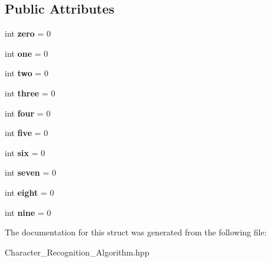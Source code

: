 \subsection*{Public Attributes}
\begin{DoxyCompactItemize}
\item 
\mbox{\label{struct_digit_result_distribution_a00bb825f2e2756c621e1d38a1ecf0818}} 
int {\bfseries zero} = 0
\item 
\mbox{\label{struct_digit_result_distribution_a7ba8276b62ae06adf7e7e9758f08f7b4}} 
int {\bfseries one} = 0
\item 
\mbox{\label{struct_digit_result_distribution_a56239fa561bbf02f884b927537e4e641}} 
int {\bfseries two} = 0
\item 
\mbox{\label{struct_digit_result_distribution_a7577349008e126903118cfd374098b13}} 
int {\bfseries three} = 0
\item 
\mbox{\label{struct_digit_result_distribution_a405d14955c2198e42e83f58403176bca}} 
int {\bfseries four} = 0
\item 
\mbox{\label{struct_digit_result_distribution_abcc61ba15e9235041d116e79f2a8ff75}} 
int {\bfseries five} = 0
\item 
\mbox{\label{struct_digit_result_distribution_a6f41149ee35dc44af32773a52cf75148}} 
int {\bfseries six} = 0
\item 
\mbox{\label{struct_digit_result_distribution_a75d26b38393b342d67827321b94e8679}} 
int {\bfseries seven} = 0
\item 
\mbox{\label{struct_digit_result_distribution_a787381e6fbbad76f45ddfe1d63281532}} 
int {\bfseries eight} = 0
\item 
\mbox{\label{struct_digit_result_distribution_a1564e6dac43bf001c91962729ce97337}} 
int {\bfseries nine} = 0
\end{DoxyCompactItemize}


The documentation for this struct was generated from the following file\+:\begin{DoxyCompactItemize}
\item 
Character\+\_\+\+Recognition\+\_\+\+Algorithm.\+hpp\end{DoxyCompactItemize}
